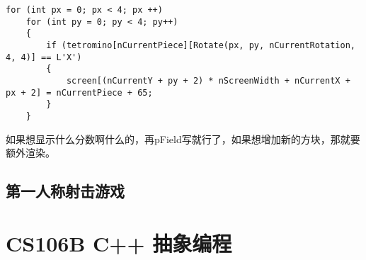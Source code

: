 \documentclass{article}
\begin{document}
\begin{sloppypar}
\begin{lstlisting}
for (int px = 0; px < 4; px ++)
	for (int py = 0; py < 4; py++)
	{
		if (tetromino[nCurrentPiece][Rotate(px, py, nCurrentRotation, 4, 4)] == L'X')
		{
			screen[(nCurrentY + py + 2) * nScreenWidth + nCurrentX + px + 2] = nCurrentPiece + 65;
		}
	}

\end{lstlisting}
如果想显示什么分数啊什么的，再pField写就行了，如果想增加新的方块，那就要额外渲染。

\subsection{第一人称射击游戏}

\section{CS106B C++ 抽象编程}


\printbibliography                               
\end{sloppypar}
\end{document}
